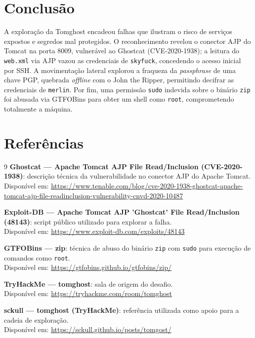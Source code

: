 \documentclass[12pt]{article}
\begin{document}
\section{Conclusão}

A exploração da Tomghost encadeou falhas que ilustram o risco de serviços expostos e segredos mal protegidos. O reconhecimento revelou o conector AJP do Tomcat na porta 8009, vulnerável ao Ghostcat (CVE-2020-1938); a leitura do \texttt{web.xml} via AJP vazou as credenciais de \texttt{skyfuck}, concedendo o acesso inicial por SSH. A movimentação lateral explorou a fraqueza da \textit{passphrase} de uma chave PGP, quebrada \textit{offline} com o John the Ripper, permitindo decifrar as credenciais de \texttt{merlin}. Por fim, uma permissão \texttt{sudo} indevida sobre o binário \texttt{zip} foi abusada via GTFOBins para obter um shell como \texttt{root}, comprometendo totalmente a máquina.

\section{Referências}

\begin{thebibliography}{9}
    \textbf{Ghostcat --- Apache Tomcat AJP File Read/Inclusion (CVE-2020-1938)}: descrição técnica da vulnerabilidade no conector AJP do Apache Tomcat. \\
    Disponível em: \url{https://www.tenable.com/blog/cve-2020-1938-ghostcat-apache-tomcat-ajp-file-readinclusion-vulnerability-cnvd-2020-10487}

    \textbf{Exploit-DB --- Apache Tomcat AJP 'Ghostcat' File Read/Inclusion (48143)}: script público utilizado para explorar a falha. \\
    Disponível em: \url{https://www.exploit-db.com/exploits/48143}

    \textbf{GTFOBins --- zip}: técnica de abuso do binário \texttt{zip} com \texttt{sudo} para execução de comandos como \texttt{root}. \\
    Disponível em: \url{https://gtfobins.github.io/gtfobins/zip/}

    \textbf{TryHackMe --- tomghost}: sala de origem do desafio. \\
    Disponível em: \url{https://tryhackme.com/room/tomghost}

    \textbf{sckull --- tomghost (TryHackMe)}: referência utilizada como apoio para a cadeia de exploração. \\
    Disponível em: \url{https://sckull.github.io/posts/tomgost/}

\end{thebibliography}
\end{document}
